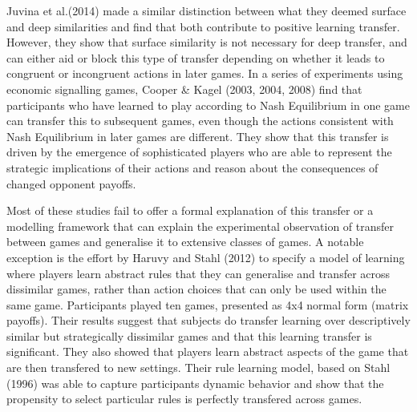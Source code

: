 \documentclass[12pt]{article}         %
\begin{document}
Juvina et al.(2014)  made a similar distinction between what they deemed surface and deep similarities and find that both contribute to positive learning transfer. However, they show that surface similarity is not necessary for deep transfer, and can either aid or block this type of transfer depending on whether it leads to congruent or incongruent actions in later games. In a series of experiments using economic signalling games, Cooper & Kagel (2003, 2004, 2008) find that participants who have learned to play according to Nash Equilibrium in one game can transfer this to subsequent games, even though the actions consistent with Nash Equilibrium in later games are different.  They show that this transfer is driven by the emergence of sophisticated players who are able to represent the strategic implications of their actions and reason about the consequences of changed opponent payoffs.  

Most of these studies fail to offer a formal explanation of this transfer or a modelling framework that can explain the experimental observation of transfer between games and generalise it to extensive classes of games. A notable exception is the effort by Haruvy and Stahl (2012) to specify a model of learning where players learn abstract rules that they can generalise and transfer across dissimilar games, rather than action choices that can only be used within the same game. Participants played ten games, presented as 4x4 normal form (matrix payoffs). Their results suggest that subjects do transfer learning over descriptively similar but strategically dissimilar games and that this learning transfer is significant. They also showed that players learn abstract aspects of the game that are then transfered to new settings. Their rule learning model, based on Stahl (1996) was able to capture participants dynamic behavior and show that the propensity to select particular rules is perfectly transfered across games.  
 
\end{document}
